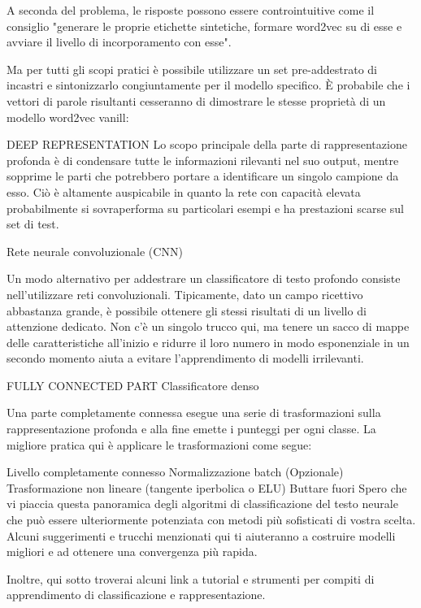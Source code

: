 A seconda del problema, le risposte possono essere controintuitive come il consiglio "generare le proprie etichette sintetiche, formare word2vec su di esse e avviare il livello di incorporamento con esse".

Ma per tutti gli scopi pratici è possibile utilizzare un set pre-addestrato di incastri e sintonizzarlo congiuntamente per il modello specifico. È probabile che i vettori di parole risultanti cesseranno di dimostrare le stesse proprietà di un modello word2vec vanill:


DEEP REPRESENTATION
Lo scopo principale della parte di rappresentazione profonda è di condensare tutte le informazioni rilevanti nel suo output, mentre sopprime le parti che potrebbero portare a identificare un singolo campione da esso. Ciò è altamente auspicabile in quanto la rete con capacità elevata probabilmente si sovraperforma su particolari esempi e ha prestazioni scarse sul set di test.

Rete neurale convoluzionale (CNN)

Un modo alternativo per addestrare un classificatore di testo profondo consiste nell'utilizzare reti convoluzionali. Tipicamente, dato un campo ricettivo abbastanza grande, è possibile ottenere gli stessi risultati di un livello di attenzione dedicato. Non c'è un singolo trucco qui, ma tenere un sacco di mappe delle caratteristiche all'inizio e ridurre il loro numero in modo esponenziale in un secondo momento aiuta a evitare l'apprendimento di modelli irrilevanti.


FULLY CONNECTED PART
Classificatore denso

Una parte completamente connessa esegue una serie di trasformazioni sulla rappresentazione profonda e alla fine emette i punteggi per ogni classe. La migliore pratica qui è applicare le trasformazioni come segue:

Livello completamente connesso
Normalizzazione batch
(Opzionale) Trasformazione non lineare (tangente iperbolica o ELU)
Buttare fuori
Spero che vi piaccia questa panoramica degli algoritmi di classificazione del testo neurale che può essere ulteriormente potenziata con metodi più sofisticati di vostra scelta. Alcuni suggerimenti e trucchi menzionati qui ti aiuteranno a costruire modelli migliori e ad ottenere una convergenza più rapida.

Inoltre, qui sotto troverai alcuni link a tutorial e strumenti per compiti di apprendimento di classificazione e rappresentazione.




